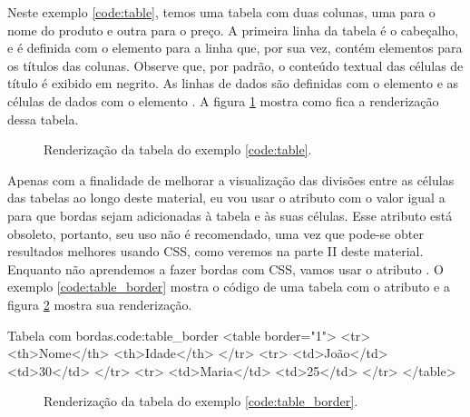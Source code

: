 Neste exemplo \ref{code:table}, temos uma tabela com duas colunas, uma para o nome do produto e outra para o preço. A primeira linha da tabela é o cabeçalho, e é definida com o elemento  para a linha que, por sua vez, contém elementos  para os títulos das colunas. Observe que, por padrão, o conteúdo textual das células de título é exibido em negrito. As linhas de dados são definidas com o elemento  e as células de dados com o elemento . A figura \ref{fig:table} mostra como fica a renderização dessa tabela.

\begin{figure}[ht!]    
    \caption{Renderização da tabela do exemplo \ref{code:table}.}
    \label{fig:table}
\end{figure}

Apenas com a finalidade de melhorar a visualização das divisões entre as células das tabelas ao longo deste material, eu vou usar o atributo  com o valor igual a  para que bordas sejam adicionadas à tabela e às suas células. Esse atributo está obsoleto, portanto, seu uso não é recomendado, uma vez que pode-se obter resultados melhores usando CSS, como veremos na parte II deste material. Enquanto não aprendemos a fazer bordas com CSS, vamos usar o atributo . O exemplo \ref{code:table_border} mostra o código de uma tabela com o atributo  e a figura \ref{fig:table_border} mostra sua renderização.

\begin{htmlcode}{Tabela com bordas.}{code:table_border}
<table border="1">
    <tr>
        <th>Nome</th>
        <th>Idade</th>
    </tr>
    <tr>
        <td>João</td>
        <td>30</td>
    </tr>
    <tr>
        <td>Maria</td>
        <td>25</td>
    </tr>
</table>
\end{htmlcode}

\begin{figure}[ht!]    
    \caption{Renderização da tabela do exemplo \ref{code:table_border}.}
    \label{fig:table_border}
\end{figure}

